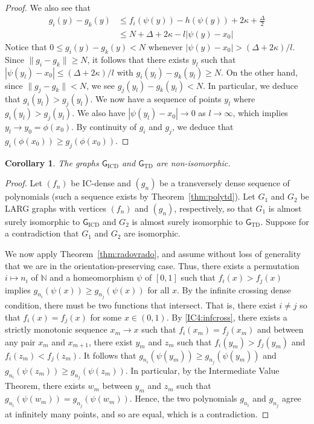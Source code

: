 \documentclass{daj}
\newtheorem{cor}[thm]{Corollary}
\newcommand{\N}{\mathbb N}
\begin{document}
\begin{proof}
We also see that
\begin{align*}
g_i(y)-g_k(y)&\le f_i(\psi(y))-h(\psi(y))+2\kappa+\tfrac\Delta 2\\
&\le N+\Delta+2\kappa-l|\psi(y)-x_0|
\end{align*}
Notice that $0\le g_i(y)-g_k(y)< N$ whenever $|\psi(y)-x_0|> (\Delta+2\kappa)/l$.
Since $\|g_i-g_k\|\ge N$, it follows that there exists $y_l$ such that
$|\psi(y_l)-x_0|\le (\Delta+2\kappa)/l$ with
$g_i(y_l)-g_k(y_l)\ge N$. On the other hand, since $\|g_j-g_k\|<N$, we see
$g_j(y_l)-g_k(y_l)< N$. In particular, we deduce that $g_i(y_l)>g_j(y_l)$.
We now have a sequence of points $y_l$ where
$g_i(y_l)>g_j(y_l)$. We also have $|\psi(y_l)-x_0|\to 0$ as $l\to\infty$,
which implies $y_l\to y_0=\phi(x_0)$. By continuity of $g_i$ and $g_j$,
we deduce that $g_i(\phi(x_0))\ge g_j(\phi(x_0))$.
\end{proof}

\begin{cor}\label{BMnonpoly}
The  graphs $\mathsf{G}_\text{ICD}$ and $\mathsf G_\text{TD}$ are non-isomorphic.
\end{cor}

\begin{proof}
Let $(f_n)$ be IC-dense and $(g_n)$ be a transversely dense sequence of polynomials
(such a sequence exists by Theorem~\ref{thm:polytd}).
Let $G_1$ and $G_2$ be LARG graphs with vertices $(f_n)$ and
$(g_n)$, respectively, so that $G_1$ is almost surely isomorphic to
$\mathsf{G}_\text{ICD}$ and $G_2$ is almost surely isomorphic to $\mathsf{G}_\text{TD}$.
Suppose for a contradiction that $G_1$ and $G_2$ are isomorphic.

We now apply Theorem~\ref{thm:radovrado}, and assume without loss of generality
that we are in the orientation-preserving case. Thus,
there exists a permutation $i\mapsto n_i$ of $\N$ and a homeomorphism $\psi$ of
$[0,1]$ such that $f_i(x)>f_j(x)$ implies $g_{n_i}(\psi(x)) \ge g_{n_j}(\psi(x))$ for
all $x$. By the infinite crossing dense condition, there must be two functions
that intersect. That is, there exist $i\ne j$ so  that $f_i(x)=f_j(x)$ for some
$x\in (0,1)$. By \ref{IC4:infcross}, there exists a strictly monotonic sequence $x_m\to x$ such that
$f_i(x_m)=f_j(x_m)$ and between any pair $x_m$ and $x_{m+1}$, there exist
$y_m$ and $z_{m}$ such that $f_i(y_m)>f_j(y_m)$ and $f_i(z_m)<f_j(z_m)$.
It follows that $g_{n_i}(\psi(y_m))\ge
g_{n_j}(\psi(y_m))$ and $g_{n_i}(\psi(z_m))\ge g_{n_j}(\psi(z_m))$.
In particular, by the Intermediate Value Theorem, there exists $w_m$
between $y_m$ and $z_m$ such that
$g_{n_i}(\psi(w_m))=g_{n_j}(\psi(w_m))$. Hence, the two polynomials
$g_{n_i}$ and $g_{n_j}$ agree at infinitely many points, and so are equal,
which is a contradiction.
\end{proof}
\end{document}
